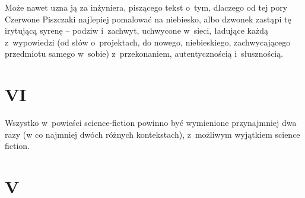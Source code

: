 \documentclass[oneside,polish,11pt,rmheadings]{mwbk}
\begin{document}
Może nawet uzna ją za inżyniera, piszącego tekst o~tym, dlaczego od tej pory Czerwone Piszczaki najlepiej pomalować na niebiesko, albo dzwonek zastąpi tę irytującą syrenę -- podziw i~zachwyt, uchwycone w~sieci, ładujące każdą z~wypowiedzi (od słów o~projektach, do nowego, niebieskiego, zachwycającego przedmiotu samego w~sobie) z~przekonaniem, autentycznością i~słusznością. 

\section*{VI}


Wszystko w~powieści science-fiction powinno być wymienione przynajmniej dwa razy (w co najmniej dwóch różnych kontekstach), z~możliwym wyjątkiem science fiction. 

\section*{V}
\end{document}

